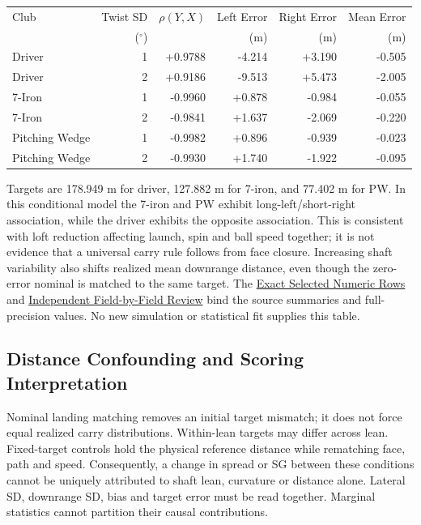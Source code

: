 \documentclass[11pt,letterpaper]{article}
\begin{document}
\begin{center}
\small
\begin{tabular}{lrrrrr}
\toprule
Club & Twist SD & $\rho(Y,X)$ & Left Error & Right Error & Mean Error\\
 & ($^\circ$) & & (m) & (m) & (m)\\
\midrule
Driver & 1 & +0.9788 & -4.214 & +3.190 & -0.505 \\
Driver & 2 & +0.9186 & -9.513 & +5.473 & -2.005 \\
7-Iron & 1 & -0.9960 & +0.878 & -0.984 & -0.055 \\
7-Iron & 2 & -0.9841 & +1.637 & -2.069 & -0.220 \\
Pitching Wedge & 1 & -0.9982 & +0.896 & -0.939 & -0.023 \\
Pitching Wedge & 2 & -0.9930 & +1.740 & -1.922 & -0.095 \\
\bottomrule
\end{tabular}
\end{center}
Targets are 178.949 m for driver, 127.882 m for 7-iron, and 77.402 m for PW.
In this conditional model the 7-iron and PW exhibit long-left/short-right
association, while the driver exhibits the opposite association. This is
consistent with loft reduction affecting launch, spin and ball speed together;
it is not evidence that a universal carry rule follows from face closure.
Increasing shaft variability also shifts realized mean downrange distance,
even though the zero-error nominal is matched to the same target. The
\href{phase2/validation/selected_headline_traceability_v1/review.json}{Exact Selected Numeric Rows}
and \href{phase2/validation/selected_headline_traceability_v1/astra_review.json}{Independent Field-by-Field Review}
bind the source summaries and full-precision values. No new simulation or
statistical fit supplies this table.

\subsection{Distance Confounding and Scoring Interpretation}
Nominal landing matching removes an initial target mismatch; it does not
force equal realized carry distributions. Within-lean targets may differ
across lean. Fixed-target controls hold the physical reference distance while
rematching face, path and speed. Consequently, a change in spread or SG between
these conditions cannot be uniquely attributed to shaft lean, curvature or
distance alone. Lateral SD, downrange SD, bias and target error must be read
together. Marginal statistics cannot partition their causal contributions.
\end{document}
